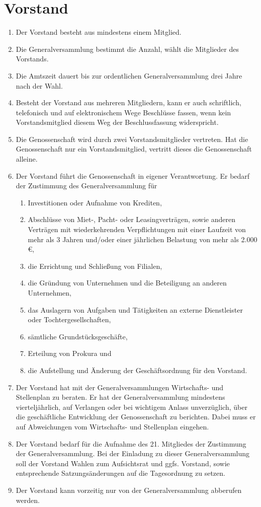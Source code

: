 \documentclass[a4paper, 12pt]{scrartcl}
\begin{document}
\section{Vorstand}
\begin{enumerate}
  \item Der Vorstand besteht aus mindestens einem Mitglied.
  \item Die Generalversammlung bestimmt die Anzahl, wählt die Mitglieder des Vorstands.
  \item Die Amtszeit dauert bis zur ordentlichen Generalversammlung drei Jahre nach der Wahl.
  \item Besteht der Vorstand aus mehreren Mitgliedern, kann er auch schriftlich, telefonisch und auf elektronischem Wege Beschlüsse fassen, wenn kein Vorstandsmitglied diesem Weg der Beschlussfassung widerspricht.
  \item Die Genossenschaft wird durch zwei Vorstandsmitglieder vertreten. Hat die Genossenschaft nur ein Vorstandsmitglied, vertritt dieses die Genossenschaft alleine.
  \item Der Vorstand führt die Genossenschaft in eigener Verantwortung. Er bedarf der Zustimmung des Generalversammlung für
  \begin{enumerate}
    \item Investitionen oder Aufnahme von Krediten,
    \item Abschlüsse von Miet-, Pacht- oder Leasingverträgen, sowie anderen Verträgen mit wiederkehrenden Verpflichtungen mit einer Laufzeit von mehr als 3 Jahren und/oder einer jährlichen Belastung von mehr als 2.000 \euro,
    \item die Errichtung und Schließung von Filialen,
    \item die Gründung von Unternehmen und die Beteiligung an anderen Unternehmen,
    \item das Auslagern von Aufgaben und Tätigkeiten an externe Dienstleister oder Tochtergesellschaften,
    \item sämtliche Grundstücksgeschäfte,
    \item Erteilung von Prokura und
    \item die Aufstellung und Änderung der Geschäftsordnung für den Vorstand.
  \end{enumerate}
  \item Der Vorstand hat mit der Generalversammlungen Wirtschafts- und Stellenplan zu beraten. Er hat der Generalversammlung mindestens vierteljährlich, auf Verlangen oder bei wichtigem Anlass unverzüglich, über die geschäftliche Entwicklung der Genossenschaft zu berichten. Dabei muss er auf Abweichungen vom Wirtschafts- und Stellenplan eingehen.
  \item Der Vorstand bedarf für die Aufnahme des 21. Mitgliedes der Zustimmung der Generalversammlung. Bei der Einladung zu dieser Generalversammlung soll der Vorstand Wahlen zum Aufsichtsrat und ggfs. Vorstand, sowie entsprechende Satzungsänderungen auf die Tagesordnung zu setzen.
  \item Der Vorstand kann vorzeitig nur von der Generalversammlung abberufen werden.
\end{enumerate}
\end{document}
